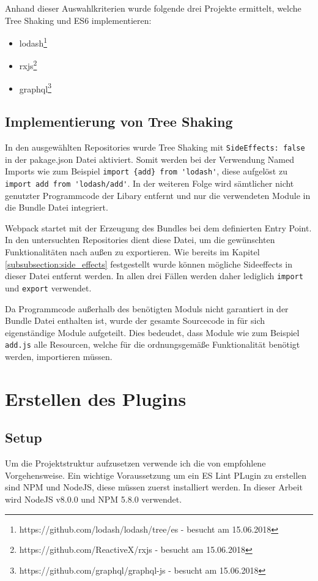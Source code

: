 Anhand dieser Auswahlkriterien wurde folgende drei Projekte ermittelt, welche Tree Shaking und ES6  implementieren:

\begin{itemize}
	\item{lodash\footnote{https://github.com/lodash/lodash/tree/es - besucht am 15.06.2018}}
	\item{rxjs\footnote{https://github.com/ReactiveX/rxjs - besucht am 15.06.2018}}
	\item{graphql\footnote{https://github.com/graphql/graphql-js - besucht am 15.06.2018}}
\end{itemize}


\subsection{Implementierung von Tree Shaking}
In den ausgewählten Repositories wurde Tree Shaking mit \lstinline{SideEffects: false} in der pakage.json Datei aktiviert. Somit werden bei der Verwendung Named Imports wie zum Beispiel \lstinline|import {add} from 'lodash'|, diese aufgelöst zu \lstinline{import add from 'lodash/add'}. In der weiteren Folge wird sämtlicher nicht genutzter Programmcode der Libary entfernt und nur die verwendeten Module in die Bundle Datei integriert.

Webpack startet mit der Erzeugung des Bundles bei dem definierten Entry Point. In den untersuchten Repositories dient diese Datei, um die gewünschten Funktionalitäten nach außen zu exportieren. Wie bereits im Kapitel \ref{subsubsection:side_effects} festgestellt wurde können mögliche Sideeffects in dieser Datei entfernt werden. In allen drei Fällen werden daher lediglich \lstinline{import} und \lstinline{export} verwendet.

Da Programmcode außerhalb des benötigten Moduls nicht garantiert in der Bundle Datei enthalten ist, wurde der gesamte Sourcecode in für sich eigenständige Module aufgeteilt. Dies bedeudet, dass Module wie zum Beispiel \lstinline{add.js} alle Resourcen, welche für die ordnungsgemäße Funktionalität benötigt werden, importieren müssen.

\section{Erstellen des Plugins}
\subsection{Setup}
Um die Projektstruktur aufzusetzen verwende ich die von \textcite{ESLintNewRules} empfohlene Vorgehensweise. Ein wichtige Voraussetzung um ein ES Lint PLugin zu erstellen sind NPM und NodeJS, diese müssen zuerst installiert werden. In dieser Arbeit wird NodeJS v8.0.0 und NPM 5.8.0 verwendet.

